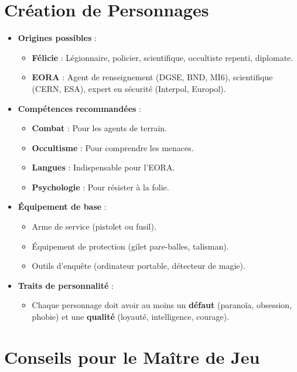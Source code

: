 \documentclass[10pt,a5paper,twoside]{book}
\begin{document}
\section{Création de Personnages}

\begin{itemize}
	\item \textbf{Origines possibles} :
	\begin{itemize}
		\item \textbf{Félicie} : Légionnaire, policier, scientifique, occultiste repenti, diplomate.
		\item \textbf{EORA} : Agent de renseignement (DGSE, BND, MI6), scientifique (CERN, ESA), expert en sécurité (Interpol, Europol).
	\end{itemize}
	\item \textbf{Compétences recommandées} :
	\begin{itemize}
		\item \textbf{Combat} : Pour les agents de terrain.
		\item \textbf{Occultisme} : Pour comprendre les menaces.
		\item \textbf{Langues} : Indispensable pour l'EORA.
		\item \textbf{Psychologie} : Pour résister à la folie.
	\end{itemize}
	\item \textbf{Équipement de base} :
	\begin{itemize}
		\item Arme de service (pistolet ou fusil).
		\item Équipement de protection (gilet pare-balles, talisman).
		\item Outils d'enquête (ordinateur portable, détecteur de magie).
	\end{itemize}
	\item \textbf{Traits de personnalité} :
	\begin{itemize}
		\item Chaque personnage doit avoir au moins un \textbf{défaut} (paranoïa, obsession, phobie) et une \textbf{qualité} (loyauté, intelligence, courage).
	\end{itemize}
\end{itemize}

\newpage

\section{Conseils pour le Maître de Jeu}
\end{document}
